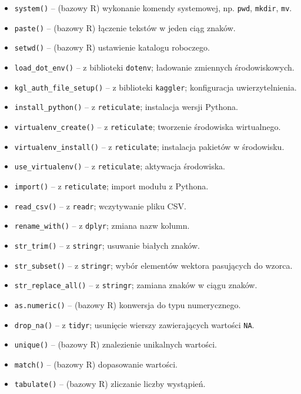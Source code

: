 \documentclass[polish]{article}
\begin{document}
    \begin{itemize}
        \item \texttt{system()} -- (bazowy R) wykonanie komendy systemowej, np. \texttt{pwd}, \texttt{mkdir}, \texttt{mv}.
        \item \texttt{paste()} -- (bazowy R) łączenie tekstów w jeden ciąg znaków.
        \item \texttt{setwd()} -- (bazowy R) ustawienie katalogu roboczego.
        \item \texttt{load\_dot\_env()} -- z biblioteki \texttt{dotenv}; ładowanie zmiennych środowiskowych.
        \item \texttt{kgl\_auth\_file\_setup()} -- z biblioteki \texttt{kaggler}; konfiguracja uwierzytelnienia.
        \item \texttt{install\_python()} -- z \texttt{reticulate}; instalacja wersji Pythona.
        \item \texttt{virtualenv\_create()} -- z \texttt{reticulate}; tworzenie środowiska wirtualnego.
        \item \texttt{virtualenv\_install()} -- z \texttt{reticulate}; instalacja pakietów w środowisku.
        \item \texttt{use\_virtualenv()} -- z \texttt{reticulate}; aktywacja środowiska.
        \item \texttt{import()} -- z \texttt{reticulate}; import modułu z Pythona.
        \item \texttt{read\_csv()} -- z \texttt{readr}; wczytywanie pliku CSV.
        \item \texttt{rename\_with()} -- z \texttt{dplyr}; zmiana nazw kolumn.
        \item \texttt{str\_trim()} -- z \texttt{stringr}; usuwanie białych znaków.
        \item \texttt{str\_subset()} -- z \texttt{stringr}; wybór elementów wektora pasujących do wzorca.
        \item \texttt{str\_replace\_all()} -- z \texttt{stringr}; zamiana znaków w ciągu znaków.
        \item \texttt{as.numeric()} -- (bazowy R) konwersja do typu numerycznego.
        \item \texttt{drop\_na()} -- z \texttt{tidyr}; usunięcie wierszy zawierających wartości \texttt{NA}.
        \item \texttt{unique()} -- (bazowy R) znalezienie unikalnych wartości.
        \item \texttt{match()} -- (bazowy R) dopasowanie wartości.
        \item \texttt{tabulate()} -- (bazowy R) zliczanie liczby wystąpień.

\end{itemize}
\end{document}
